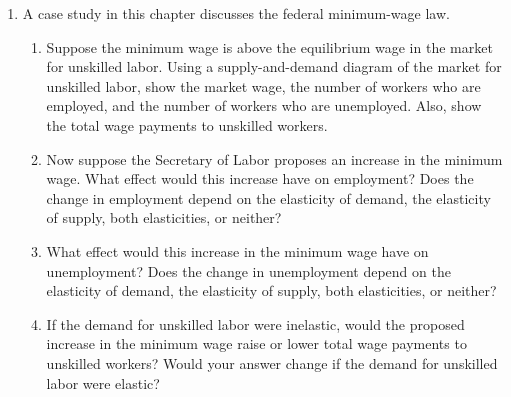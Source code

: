 \documentclass{article}
\begin{document}
\begin{enumerate}
\begin{enumerate}
	\item Are consumers of gasoline helped or hurt by this tax? Why?
	
	\item Are workers in the oil industry helped or hurt by this tax? Why?
	
	\end{enumerate}
	
\item A case study in this chapter discusses the federal minimum-wage law.

	\begin{enumerate}

	\item Suppose the minimum wage is above the equilibrium wage in the market for unskilled labor. Using a supply-and-demand diagram of the market for unskilled labor, show the market wage, the number of workers who are employed, and the number of workers who are unemployed. Also, show the total wage payments to unskilled workers.
	
	\item Now suppose the Secretary of Labor proposes an increase in the minimum wage. What effect would this increase have on employment? Does the change in employment depend on the elasticity of demand, the elasticity of supply, both elasticities, or neither?
	
	\item What effect would this increase in the minimum wage have on unemployment? Does the change in unemployment depend on the elasticity of demand, the elasticity of supply, both elasticities, or neither?
	
	\item If the demand for unskilled labor were inelastic, would the proposed increase in the minimum wage raise or lower total  wage payments to unskilled workers? Would your answer change if the demand for unskilled labor were elastic?
	
	\end{enumerate}
	
\end{enumerate}
\end{document}

